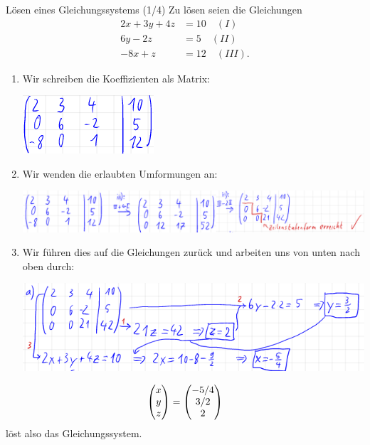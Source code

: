 \begin{Beispiel}
{Lösen eines Gleichungssystems (1/4)}
Zu lösen seien die Gleichungen
\begin{align*}
    2x+3y+4z&=10\quad (I)\\
    6y-2z&=5\quad (II)\\
    -8x+z&=12\quad (III).
\end{align*}
\begin{enumerate}
    \item Wir schreiben die Koeffizienten als Matrix:
\begin{center}
    \includegraphics[width=.2\textwidth]{Dateien/00/11GaussA1.PNG}
\end{center}
    \item Wir wenden die erlaubten Umformungen an:
\begin{center}
    \includegraphics[width=.7\textwidth]{Dateien/00/11GaussA2.PNG}
\end{center}
    \item Wir führen dies auf die Gleichungen zurück und arbeiten uns von unten nach oben durch:
\begin{center}
    \includegraphics[width=.6\textwidth]{Dateien/00/11GaussA3.PNG}
\end{center}
\end{enumerate}
\begin{equation*}
    \begin{pmatrix}x\\y\\z\end{pmatrix}=\begin{pmatrix}-5/4\\3/2\\2\end{pmatrix}
\end{equation*}
löst also das Gleichungssystem.\\
\end{Beispiel}
